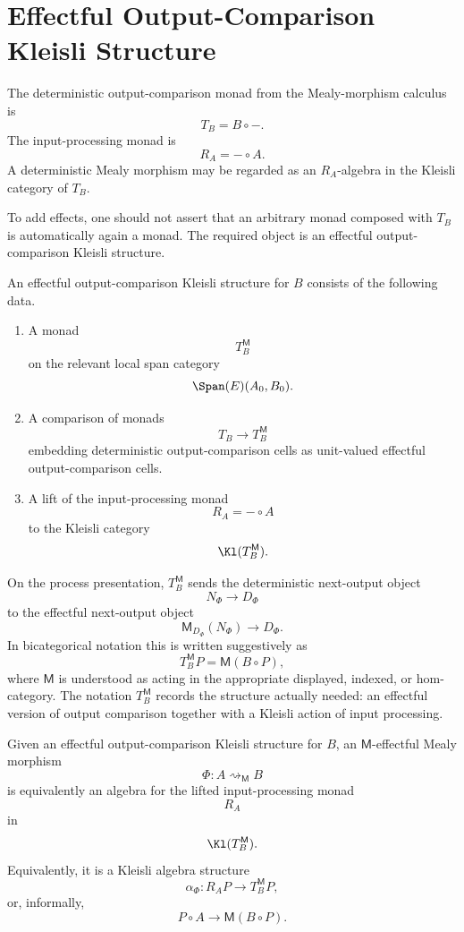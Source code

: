 \section{Effectful Output-Comparison Kleisli Structure}
\label{sec:effectful-output-comparison-kleisli-structure}

The deterministic output-comparison monad from the Mealy-morphism calculus is
\[
T_B=B\circ - .
\]
The input-processing monad is
\[
R_A=-\circ A .
\]
A deterministic Mealy morphism may be regarded as an \(R_A\)-algebra in the Kleisli category of
\(T_B\).

To add effects, one should not assert that an arbitrary monad composed with \(T_B\) is automatically
again a monad.  The required object is an effectful output-comparison Kleisli structure.

\begin{definition}
\label{def:effectful-output-comparison-kleisli-structure}
An effectful output-comparison Kleisli structure for \(B\) consists of the following data.

\begin{enumerate}
\item A monad
\[
T_B^{\mathsf M}
\]
on the relevant local span category
\[
\Span(E)(A_0,B_0).
\]

\item A comparison of monads
\[
T_B\longrightarrow T_B^{\mathsf M}
\]
embedding deterministic output-comparison cells as unit-valued effectful output-comparison cells.

\item A lift of the input-processing monad
\[
R_A=-\circ A
\]
to the Kleisli category
\[
\Kl(T_B^{\mathsf M}).
\]
\end{enumerate}
\end{definition}

On the process presentation, \(T_B^{\mathsf M}\) sends the deterministic next-output object
\[
N_\Phi\to D_\Phi
\]
to the effectful next-output object
\[
\mathsf M_{D_\Phi}(N_\Phi)\to D_\Phi .
\]
In bicategorical notation this is written suggestively as
\[
T_B^{\mathsf M}P
=
\mathsf M(B\circ P),
\]
where \(\mathsf M\) is understood as acting in the appropriate displayed, indexed, or hom-category.
The notation \(T_B^{\mathsf M}\) records the structure actually needed: an effectful version of
output comparison together with a Kleisli action of input processing.

\begin{proposition}
\label{prop:effectful-kleisli-algebra-form}
Given an effectful output-comparison Kleisli structure for \(B\), an
\(\mathsf M\)-effectful Mealy morphism
\[
\Phi:A\rightsquigarrow_{\mathsf M}B
\]
is equivalently an algebra for the lifted input-processing monad
\[
R_A
\]
in
\[
\Kl(T_B^{\mathsf M}).
\]
Equivalently, it is a Kleisli algebra structure
\[
\alpha_\Phi:
R_A P
\longrightarrow
T_B^{\mathsf M}P,
\]
or, informally,
\[
P\circ A
\longrightarrow
\mathsf M(B\circ P).
\]
\end{proposition}

